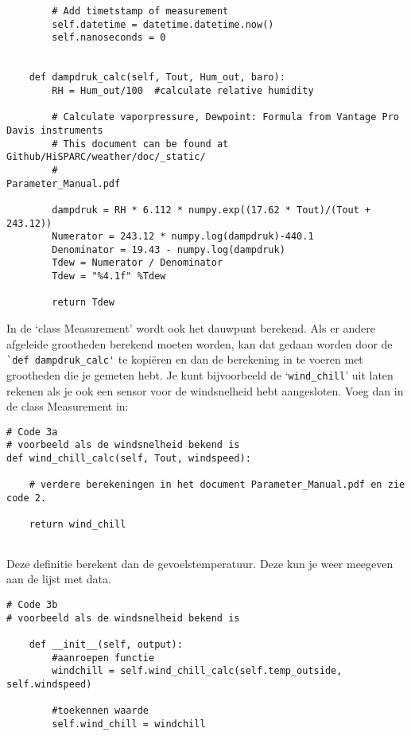 \begin{verbatim}
        # Add timetstamp of measurement
        self.datetime = datetime.datetime.now()
        self.nanoseconds = 0


    def dampdruk_calc(self, Tout, Hum_out, baro):
        RH = Hum_out/100  #calculate relative humidity

        # Calculate vaporpressure, Dewpoint: Formula from Vantage Pro Davis instruments
        # This document can be found at Github/HiSPARC/weather/doc/_static/
        #                                               Parameter_Manual.pdf

        dampdruk = RH * 6.112 * numpy.exp((17.62 * Tout)/(Tout + 243.12))
        Numerator = 243.12 * numpy.log(dampdruk)-440.1
        Denominator = 19.43 - numpy.log(dampdruk)
        Tdew = Numerator / Denominator
        Tdew = "%4.1f" %Tdew

        return Tdew

\end{verbatim}

In de `class Measurement' wordt ook het dauwpunt berekend. Als er andere afgeleide grootheden 
berekend moeten worden, kan dat gedaan worden door de \verb|`def dampdruk_calc'| te kopiëren en 
dan de berekening in te voeren met grootheden die je gemeten hebt. Je kunt
bijvoorbeeld de `\verb|wind_chill|' uit laten rekenen als je ook een sensor voor de 
windsnelheid hebt aangesloten. Voeg dan in de class Measurement in:

\begin{verbatim}
# Code 3a
# voorbeeld als de windsnelheid bekend is
def wind_chill_calc(self, Tout, windspeed):
    
    # verdere berekeningen in het document Parameter_Manual.pdf en zie code 2.
    
    return wind_chill
    
\end{verbatim}        

Deze definitie berekent dan de gevoelstemperatuur. Deze kun je weer meegeven aan 
de lijst met data.

\begin{verbatim}
# Code 3b
# voorbeeld als de windsnelheid bekend is

    def __init__(self, output):
        #aanroepen functie
        windchill = self.wind_chill_calc(self.temp_outside, self.windspeed)

        #toekennen waarde
        self.wind_chill = windchill
        
\end{verbatim}   
        
